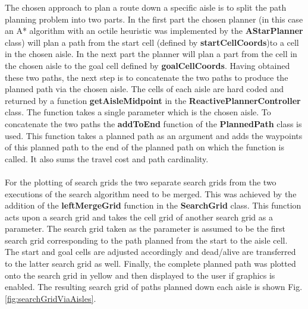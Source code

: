 \documentclass[a4paper,12pt]{article}
\begin{document}
			The chosen approach to plan a route down a specific aisle is to split the path planning problem into two parts. In the first part the chosen planner (in this case an A* algorithm with an octile heuristic was implemented by the \textbf{AStarPlanner} class) will plan a path from the start cell (defined by \textbf{startCellCoords})to a cell in the chosen aisle. In the next part the planner will plan a part from the cell in the chosen aisle to the goal cell defined by \textbf{goalCellCoords}. Having obtained these two paths, the next step is to concatenate the two paths to produce the planned path via the chosen aisle. The cells of each aisle are hard coded and returned by a function \textbf{getAisleMidpoint} in the \textbf{ReactivePlannerController} class. The function takes a single parameter which is the chosen aisle. To concatenate the two paths the \textbf{addToEnd} function of the \textbf{PlannedPath} class is used. This function takes a planned path as an argument and adds the waypoints of this planned path to the end of the planned path on which the function is called. It also sums the travel cost and path cardinality.
			\\
			\\
			For the plotting of search grids the two separate search grids from the two executions of the search algorithm need to be merged. This was achieved by the addition of the \textbf{leftMergeGrid} function in the \textbf{SearchGrid} class. This function acts upon a search grid and takes the cell grid of another search grid as a parameter. The search grid taken as the parameter is assumed to be the first search grid corresponding to the path planned from the start to the aisle cell. The start and goal cells are adjusted accordingly and dead/alive are transferred to the latter search grid as well. Finally, the complete planned path was plotted onto the search grid in yellow and then displayed to the user if graphics is enabled. The resulting search grid of paths planned down each aisle is shown Fig. \ref{fig:searchGridViaAisles}. 
			
\end{document}
